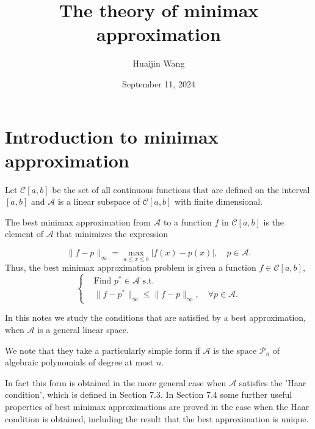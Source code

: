 \documentclass[11pt]{article}
\title{\bf The theory of minimax approximation}
\author{Huaijin Wang}
\date{September 11, 2024}
\begin{document}
\maketitle
\newtheorem{definition}{Definition}[section]
\newtheorem{property}{Property}[section]
\newtheorem{lemma}{Lemma}[section]
\newtheorem{theorem}{Theorem}[]
\newtheorem{corollary}{Corollary}[section]
\newtheorem{remark}{Remark}[section]





\tableofcontents


\newpage
\section{Introduction to minimax approximation}

Let $\mathscr{C}[a, b]$ be the set of all continuous functions that are defined on the interval $[a,b]$ and $\mathscr{A}$ is a linear subspace of $\mathscr{C}[a,b]$ with finite dimensional.

The best minimax approximation from $\mathscr{A}$ to a function $f$ in $\mathscr{C}[a, b]$ is the element of $\mathscr{A}$ that minimizes the expression

\begin{equation}
\|f-p\|_{\infty}=\max _{a \leqslant x \leqslant b}|f(x)-p(x)|, \quad p \in \mathscr{A}. 
\label{eq:1}
\end{equation}
Thus, the best minimax approximation problem is given a function $f\in \mathscr{C}[a,b]$,
\begin{equation}
\left \{
\begin{aligned}
&\text{Find } p^* \in \mathscr{A} \text{ s.t.}\\
& \|f-p^*\|_\infty \leqslant \|f-p \|_\infty,\quad \forall p\in\mathscr{A}.
\end{aligned}
\right .
\label{problem:1}
\end{equation}

In this notes we study the conditions that are satisfied by a best approximation, when $\mathscr{A}$ is a general linear space.

We note that they take a particularly simple form if $\mathscr{A}$ is the space $\mathscr{P}_{n}$ of algebraic polynomials of degree at most $n$. 

In fact this form is obtained in the more general case when $\mathscr{A}$ satisfies the 'Haar condition', which is defined in Section 7.3. In Section 7.4 some further useful properties of best minimax approximations are proved in the case when the Haar condition is obtained, including the result that the best approximation is unique. 
\end{document}
